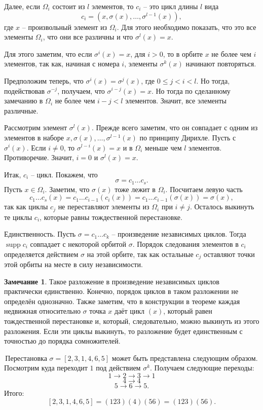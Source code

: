 \documentclass[10pt,a4paper,oneside]{book}
\theoremstyle{definition}
\newtheorem*{rem}{\color{green!50!blue}Замечание}
\renewcommand{\leq}{\leqslant}
\newcommand{\supp}{\operatorname{supp}}
\def\exm{\noindent {\bf Примеры:}}
\def\rm{\begin{rem}}
\def\erm{\end{rem}}
\begin{document}
Далее, если $\Omega_i$ состоит из $l$ элементов, то $c_i$ -- это цикл длины $l$ вида 
$$c_i=(x,\sigma(x),\dots,\sigma^{l-1}(x)), $$ где $x$ -- произвольный элемент из $\Omega_i$. Для этого необходимо показать, что это все элементы $\Omega_i$, что они все различны и что $\sigma^l(x)=x$.

Для этого заметим, что если $\sigma^i(x)=x$, для $i>0$, то в орбите $x$ не более чем $i$ элементов, так как, начиная с номера $i$, элементы $\sigma^k(x)$ начинают повторяться.

Предположим теперь, что $\sigma^i(x)=\sigma^j(x)$, где $0\leq j<i<l$. Но тогда, подействовав  $\sigma^{-j}$, получаем, что $\sigma^{i-j}(x)=x$. Но тогда по сделанному замечанию в $\Omega_i$ не более чем $i-j <l$ элементов. Значит, все элементы различные. 

Рассмотрим элемент $\sigma^l(x)$. Прежде всего заметим, что он совпадает с одним из элементов в наборе $x, \sigma(x),\dots,\sigma^{l-1}(x)$ по принципу Дирихле. Пусть с $\sigma^{i}(x)$. Если $i\neq 0$, то $\sigma^{l-i}(x)=x$ и в $\Omega_i$ меньше чем $l$ элементов. Противоречие. Значит, $i=0$ и $\sigma^l(x)=x$.

Итак, $c_i$ -- цикл. Покажем, что 
$$\sigma=c_1\dots c_s.$$
Пусть $x\in \Omega_i$. Заметим, что $\sigma(x)$ тоже лежит в $\Omega_i$. Посчитаем левую часть
$$c_1\dots c_s(x)=c_1\dots c_{i-1} (c_i(x))=c_1\dots c_{i-1} (\sigma(x))=\sigma(x),$$
так как циклы $c_j$ не переставляют элементы из $\Omega_i$ при $i\neq j$. Осталось выкинуть те циклы $c_i$, которые равны тождественной перестановке.

Единственность. Пусть $\sigma= c_1\dots c_k$ -- произведение независимых циклов. Тогда $\supp c_i$ совпадает с некоторой орбитой $\sigma$. Порядок следования элементов в $c_i$ определяется действием $\sigma$ на этой орбите, так как остальные $c_j$ оставляют точки этой орбиты на месте в силу независимости. 
\endproof

\rm Такое разложение в произведение независимых циклов практически единственно. Конечно, порядок циклов в таком разложении не определён однозначно. Также заметим, что в конструкции в теореме каждая недвижная относительно $\sigma$ точка $x$ даёт цикл $(x)$, который равен тождественной перестановке и, который, следовательно, можно выкинуть из этого разложения. 
Если эти циклы выкинуть, то разложение будет единственным с точностью до порядка сомножителей.
\erm

\exm \,Перестановка $\sigma=[2,3,1,4,6,5]$ может быть представлена следующим образом. Посмотрим куда переходит $1$ под действием $\sigma^k$. Получаем следующие переходы:
$$1\to 2\to 3 \to 1$$ 
$$4 \to 4 $$
$$ 5\to 6\to 5.$$
Итого: 
$$[2,3,1,4,6,5]=(123)(4)(56)=(123)(56).$$
\end{document}
